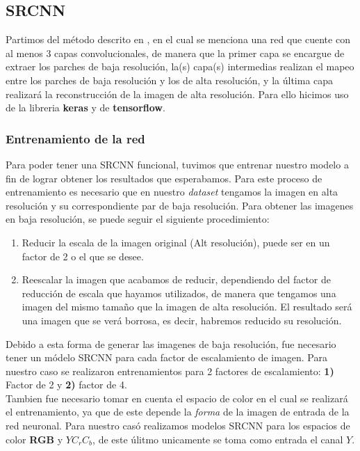\subsection{SRCNN}
Partimos del método descrito en \cite{SRCNN}, en el cual se menciona una red que cuente con al menos 3 capas convolucionales, de
manera que la primer capa se encargue de extraer los parches de baja resolución, la(s) capa(s) intermedias realizan el mapeo entre
los parches de baja resolución y los de alta resolución, y la última capa realizará la reconstrucción de la imagen de alta
resolución. Para ello hicimos uso de la libreria \textbf{keras} y de \textbf{tensorflow}.\\
\subsubsection{Entrenamiento de la red}
Para poder tener una SRCNN funcional, tuvimos que entrenar nuestro modelo a fin de lograr obtener los resultados que esperabamos.
Para este proceso de entrenamiento es necesario que en nuestro \emph{dataset} tengamos la imagen en alta resolución y su
correspondiente par de baja resolución. Para obtener las imagenes en baja resolución, se puede seguir el siguiente procedimiento:
\begin{enumerate}
    \item Reducir la escala de la imagen original (Alt resolución), puede ser en un factor de 2 o el que se desee.
    \item Reescalar la imagen que acabamos de reducir, dependiendo del factor de reducción de escala que hayamos utilizados, de
    manera que tengamos una imagen del mismo tamaño que la imagen de alta resolución. El resultado será una imagen que se verá
    borrosa, es decir, habremos reducido su resolución.
\end{enumerate}
Debido a esta forma de generar las imagenes de baja resolución, fue necesario tener un módelo SRCNN para cada factor de escalamiento
de imagen. Para nuestro caso se realizaron entrenamientos para 2 factores de escalamiento: \textbf{1)} Factor de 2 y \textbf{2)}
factor de 4.\\
Tambien fue necesario tomar en cuenta el espacio de color en el cual se realizará el entrenamiento, ya que de este depende la
\emph{forma} de la imagen de entrada de la red neuronal. Para nuestro casó realizamos modelos SRCNN para los espacios de color
\textbf{RGB} y \textbf{$YC_rC_b$}, de este úlitmo unicamente se toma como entrada el canal $Y$.\\

